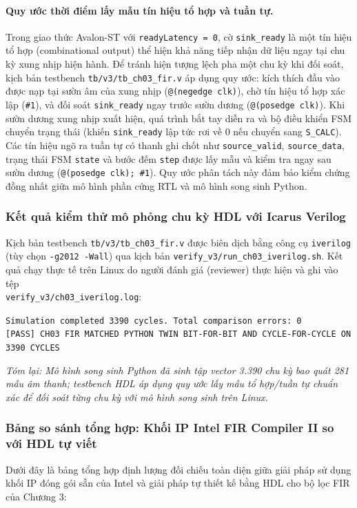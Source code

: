 \paragraph{Quy ước thời điểm lấy mẫu tín hiệu tổ hợp và tuần tự.}
Trong giao thức Avalon-ST với \texttt{readyLatency = 0}, cờ \texttt{sink\_ready} là một tín hiệu tổ hợp (combinational output) thể hiện khả năng tiếp nhận dữ liệu ngay tại chu kỳ xung nhịp hiện hành. Để tránh hiện tượng lệch pha một chu kỳ khi đối soát, kịch bản testbench \texttt{tb/v3/tb\_ch03\_fir.v} áp dụng quy ước: kích thích đầu vào được nạp tại sườn âm của xung nhịp (\texttt{@(negedge clk)}), chờ tín hiệu tổ hợp xác lập (\texttt{\#1}), và đối soát \texttt{sink\_ready} ngay trước sườn dương (\texttt{@(posedge clk)}). Khi sườn dương xung nhịp xuất hiện, quá trình bắt tay diễn ra và bộ điều khiển FSM chuyển trạng thái (khiến \texttt{sink\_ready} lập tức rơi về 0 nếu chuyển sang \texttt{S\_CALC}). Các tín hiệu ngõ ra tuần tự có thanh ghi chốt như \texttt{source\_valid}, \texttt{source\_data}, trạng thái FSM \texttt{state} và bước đếm \texttt{step} được lấy mẫu và kiểm tra ngay sau sườn dương (\texttt{@(posedge clk); \#1}). Quy ước phân tách này đảm bảo kiểm chứng đồng nhất giữa mô hình phần cứng RTL và mô hình song sinh Python.

\subsubsection*{Kết quả kiểm thử mô phỏng chu kỳ HDL với Icarus Verilog}
Kịch bản testbench \texttt{tb/v3/tb\_ch03\_fir.v} được biên dịch bằng công cụ \texttt{iverilog} (tùy chọn \texttt{-g2012 -Wall}) qua kịch bản \texttt{verify\_v3/run\_ch03\_iverilog.sh}. Kết quả chạy thực tế trên Linux do người đánh giá (reviewer) thực hiện và ghi vào tệp\\ \texttt{verify\_v3/ch03\_iverilog.log}:

\begin{center}
\small\texttt{Simulation completed 3390 cycles. Total comparison errors: 0}\\
\small\texttt{[PASS] CH03 FIR MATCHED PYTHON TWIN BIT-FOR-BIT AND CYCLE-FOR-CYCLE ON 3390 CYCLES}
\end{center}

\textit{Tóm lại: Mô hình song sinh Python đã sinh tập vector 3.390 chu kỳ bao quát 281 mẫu âm thanh; testbench HDL áp dụng quy ước lấy mẫu tổ hợp/tuần tự chuẩn xác để đối soát từng chu kỳ với mô hình song sinh trên Linux.}

\subsubsection*{Bảng so sánh tổng hợp: Khối IP Intel FIR Compiler II so với HDL tự viết}
Dưới đây là bảng tổng hợp định lượng đối chiếu toàn diện giữa giải pháp sử dụng khối IP đóng gói sẵn của Intel và giải pháp tự thiết kế bằng HDL cho bộ lọc FIR của Chương 3:


